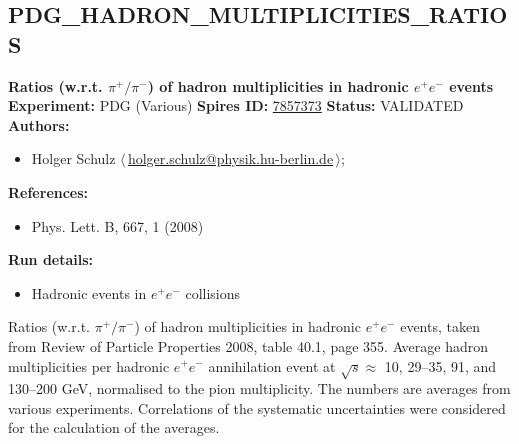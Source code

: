 \subsection[PDG\_HADRON\_MULTIPLICITIES\_RATIOS]{PDG\_HADRON\_MULTIPLICITIES\_RATIOS\,\cite{Amsler:2008zzb}}
\textbf{Ratios (w.r.t. $\pi^+/\pi^-$) of hadron multiplicities in hadronic $e^+e^-$ events}\newline
\textbf{Experiment:} PDG (Various) \newline
\textbf{Spires ID:} \href{http://www.slac.stanford.edu/spires/find/hep/www?rawcmd=key+7857373}{7857373}\newline
\textbf{Status:} VALIDATED\newline
\textbf{Authors:}
\begin{itemize}
  \item Holger Schulz $\langle\,$\href{mailto:holger.schulz@physik.hu-berlin.de}{holger.schulz@physik.hu-berlin.de}$\,\rangle$;
\end{itemize}
\textbf{References:}
\begin{itemize}
  \item Phys. Lett. B, 667, 1 (2008)
\end{itemize}
\textbf{Run details:}
\begin{itemize}

  \item Hadronic events in $e^+ e^-$ collisions\end{itemize}

\noindent Ratios (w.r.t. $\pi^+/\pi^-$) of hadron multiplicities in hadronic $e^+ e^-$ events, taken from Review of Particle Properties 2008, table 40.1, page 355.  Average hadron multiplicities per hadronic $e^+ e^-$ annihilation event at $\sqrt{s} \approx$ 10, 29--35, 91, and 130--200 GeV, normalised to the pion multiplicity. The numbers are averages from various experiments. Correlations of the systematic uncertainties were considered for the calculation of the averages.

\clearpage


\clearpage

